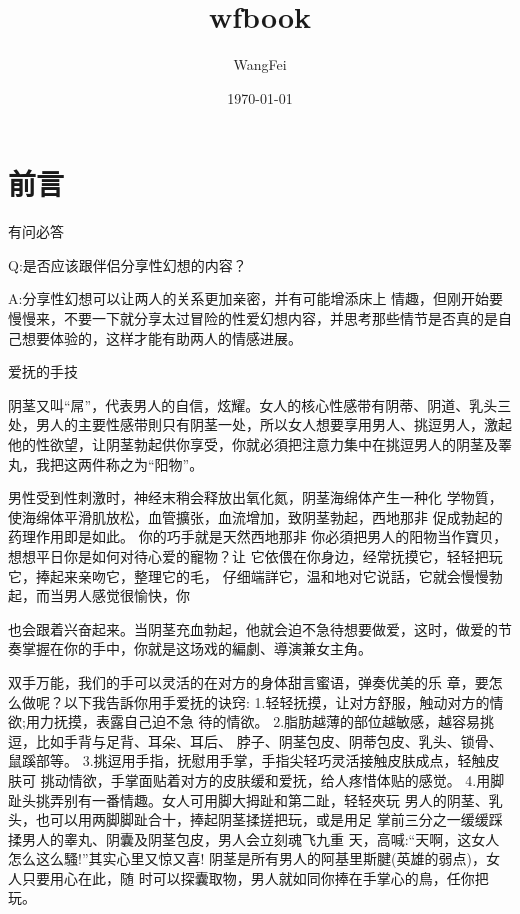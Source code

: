 \documentclass[12pt,UTF8]{ctexbook}
\title{\heiti\zihao{0} wfbook}
\author{WangFei}
\date{\today}
\begin{document}
\maketitle
\tableofcontents

\frontmatter

\chapter{前言}

有问必答

Q:是否应该跟伴侣分享性幻想的内容？

A:分享性幻想可以让两人的关系更加亲密，并有可能增添床上
情趣，但刚开始要慢慢来，不要一下就分享太过冒险的性爱幻想内容，并思考那些情节是否真的是自己想要体验的，这样才能有助两人的情感进展。

爱抚的手技

阴茎又叫“屌”，代表男人的自信，炫耀。女人的核心性感带有阴蒂、阴道、乳头三处，男人的主要性感带則只有阴茎一处，所以女人想要享用男人、挑逗男人，激起他的性欲望，让阴茎勃起供你享受，你就必須把注意力集中在挑逗男人的阴茎及睪丸，我把这两件称之为“阳物”。

男性受到性刺激时，神经末稍会释放出氧化氮，阴茎海绵体产生一种化
学物質，使海绵体平滑肌放松，血管擴张，血流增加，致阴茎勃起，西地那非
促成勃起的药理作用即是如此。
你的巧手就是天然西地那非
你必須把男人的阳物当作寶贝，想想平日你是如何对待心爱的寵物？让
它依偎在你身边，经常抚摸它，轻轻把玩它，捧起来亲吻它，整理它的毛，
仔细端詳它，温和地对它说話，它就会慢慢勃起，而当男人感觉很愉快，你

也会跟着兴奋起来。当阴茎充血勃起，他就会迫不急待想要做爱，这时，做爱的节奏掌握在你的手中，你就是这场戏的編劇、導演兼女主角。

双手万能，我们的手可以灵活的在对方的身体甜言蜜语，弹奏优美的乐
章，要怎么做呢？以下我告訴你用手爱抚的诀窍:
1.轻轻抚摸，让对方舒服，触动对方的情欲;用力抚摸，表露自己迫不急
待的情欲。
2.脂肪越薄的部位越敏感，越容易挑逗，比如手背与足背、耳朵、耳后、
脖子、阴茎包皮、阴蒂包皮、乳头、锁骨、鼠蹊部等。
3.挑逗用手指，抚慰用手掌，手指尖轻巧灵活接触皮肤成点，轻触皮肤可
挑动情欲，手掌面贴着对方的皮肤缓和爱抚，给人疼惜体贴的感觉。
4.用脚趾头挑弄别有一番情趣。女人可用脚大拇趾和第二趾，轻轻夾玩
男人的阴茎、乳头，也可以用两脚脚趾合十，捧起阴茎揉搓把玩，或是用足
掌前三分之一缓缓踩揉男人的睾丸、阴囊及阴茎包皮，男人会立刻魂飞九重
天，高喊:“天啊，这女人怎么这么騷!”其实心里又惊又喜!
阴茎是所有男人的阿基里斯腱(英雄的弱点)，女人只要用心在此，随
时可以探囊取物，男人就如同你捧在手掌心的鳥，任你把玩。
\end{document}
